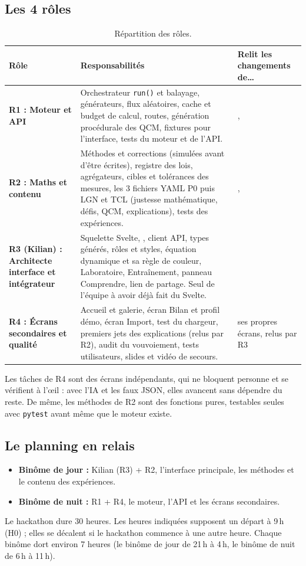 \documentclass[11pt,a4paper]{article}
\begin{document}
\subsection{Les 4 rôles}
\begin{table}[H]
  \centering
  \small
  \begin{tabularx}{\textwidth}{@{}L{3.4cm} Y L{3.6cm}@{}}
    \toprule
    \textbf{Rôle} & \textbf{Responsabilités} & \textbf{Relit les changements de\dots} \\
    \midrule
    \textbf{R1 : Moteur et API} & Orchestrateur \texttt{run()} et balayage, générateurs, flux aléatoires, cache et budget de calcul, routes, génération procédurale des QCM, fixtures pour l'interface, tests du moteur et de l'API. & ,  \\
    \midrule
    \textbf{R2 : Maths et contenu} & Méthodes et corrections (simulées avant d'être écrites), registre des lois, agrégateurs, cibles et tolérances des mesures, les 3 fichiers YAML P0 puis LGN et TCL (justesse mathématique, défis, QCM, explications), tests des expériences. & ,  \\
    \midrule
    \textbf{R3 (Kilian) : Architecte interface et intégrateur} & Squelette Svelte, , client API, types générés, rôles et styles, équation dynamique et sa règle de couleur, Laboratoire, Entraînement, panneau Comprendre, lien de partage. Seul de l'équipe à avoir déjà fait du Svelte. &  \\
    \midrule
    \textbf{R4 : Écrans secondaires et qualité} & Accueil et galerie, écran Bilan et profil démo, écran Import, test du chargeur, premiers jets des explications (relus par R2), audit du vouvoiement, tests utilisateurs, slides et vidéo de secours. & ses propres écrans, relus par R3 \\
    \bottomrule
  \end{tabularx}
  \caption{Répartition des rôles.}
\end{table}

Les tâches de R4 sont des écrans indépendants, qui ne bloquent personne et se vérifient à l'\oe il : avec l'IA et les faux JSON, elles avancent sans dépendre du reste. De même, les méthodes de R2 sont des fonctions pures, testables seules avec \texttt{pytest} avant même que le moteur existe.

\subsection{Le planning en relais}
\begin{itemize}[nosep]
  \item \textbf{Binôme de jour :} Kilian (R3) + R2, l'interface principale, les méthodes et le contenu des expériences.
  \item \textbf{Binôme de nuit :} R1 + R4, le moteur, l'API et les écrans secondaires.
\end{itemize}
Le hackathon dure 30 heures. Les heures indiquées supposent un départ à 9\,h (H0) ; elles se décalent si le hackathon commence à une autre heure. Chaque binôme dort environ 7 heures (le binôme de jour de 21\,h à 4\,h, le binôme de nuit de 6\,h à 11\,h).
\end{document}
